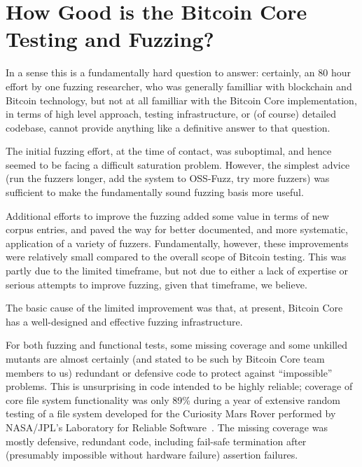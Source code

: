 \section{How Good is the Bitcoin Core Testing and Fuzzing?}

In a sense this is a fundamentally hard question to answer: certainly,
an 80 hour effort by one fuzzing researcher, who was generally
familliar with blockchain and Bitcoin technology, but not at all
familliar with the Bitcoin Core implementation, in terms of high level
approach, testing infrastructure, or (of course) detailed codebase,
cannot provide anything like a definitive answer to that question.

The initial fuzzing effort, at the time of contact, was suboptimal,
and hence seemed to be facing a difficult saturation problem.
However, the simplest advice (run the fuzzers longer, add the system
to OSS-Fuzz, try more fuzzers) was sufficient to make the
fundamentally sound fuzzing basis more useful.

Additional efforts to improve the fuzzing added some value in terms of
new corpus entries, and paved
the way for better documented, and more systematic, application of a
variety of fuzzers.  Fundamentally, however, these improvements were
relatively small compared to the overall scope of Bitcoin testing.
This was partly due to the limited timeframe, but not due to either a
lack of expertise or serious attempts to improve fuzzing, given that
timeframe, we believe.

The basic cause of the limited improvement was that, at present,
Bitcoin Core has a well-designed and effective fuzzing infrastructure.

For both fuzzing and functional tests, some missing coverage and some
unkilled mutants are almost
certainly (and stated to be such by Bitcoin Core team members to us)
redundant or defensive code to protect against ``impossible''
problems.  This is unsurprising in code intended to be highly reliable;
coverage of core file system functionality was only 89\% during a year of
extensive random testing of a file system developed for the Curiosity
Mars Rover performed by NASA/JPL's Laboratory for Reliable
Software~\cite{ICSEDiff}.  The missing coverage was mostly defensive,
redundant code, including fail-safe termination after (presumably
impossible without hardware failure)
assertion failures.